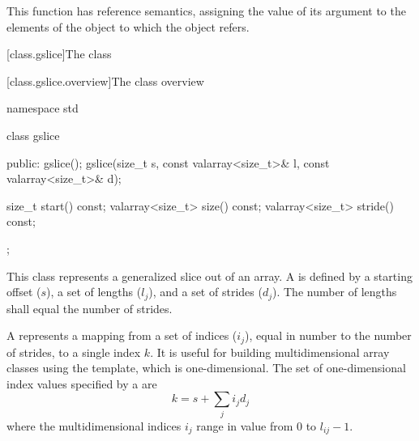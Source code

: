 \begin{itemdescr}
\pnum
This function has reference semantics, assigning the value of its argument
to the elements of the
object to which the
object refers.
\end{itemdescr}

[class.gslice]{The  class}

[class.gslice.overview]{The  class overview}

%
\begin{codeblock}
namespace std {
  class gslice {
  public:
    gslice();
    gslice(size_t s, const valarray<size_t>& l, const valarray<size_t>& d);

    size_t           start() const;
    valarray<size_t> size() const;
    valarray<size_t> stride() const;
  };
}
\end{codeblock}

\pnum
This class represents a generalized slice out of an array.
A
is defined by a starting offset ($s$),
a set of lengths ($l_j$),
and a set of strides ($d_j$).
The number of lengths shall equal the number of strides.

\pnum
A
represents a mapping from a set of indices ($i_j$),
equal in number to the number of strides, to a single index $k$.
It is useful for building multidimensional array classes using
the
template, which is one-dimensional.
The set of one-dimensional index values specified by a  are
\[ k = s + \sum_j i_j d_j \]
where the multidimensional indices $i_j$ range in value from
0 to $l_{ij} - 1$.

